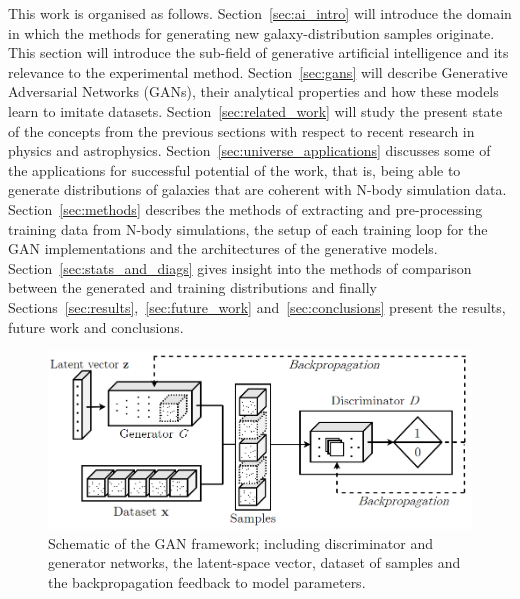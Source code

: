 \documentclass[twocolumn]{article}
\numberwithin{equation}{section}
\begin{document}
This work is organised as follows. Section~\ref{sec:ai_intro} will introduce the domain in which the methods for 
generating new galaxy-distribution samples originate. This section will introduce the sub-field of generative artificial 
intelligence and its relevance to the experimental method. Section~\ref{sec:gans} will describe Generative Adversarial 
Networks (GANs), their analytical properties and how these models learn to imitate datasets. Section~\ref{sec:related_work} 
will study the present state of the concepts from the previous sections with respect to recent research in physics and 
astrophysics. Section~\ref{sec:universe_applications} discusses some of the applications for successful potential of the 
work, that is, being able to generate distributions of galaxies that are coherent with N-body simulation data. 
Section~\ref{sec:methods} describes the methods of extracting and pre-processing training data from N-body simulations, 
the setup of each training loop for the GAN implementations and the architectures of the generative models. 
Section~\ref{sec:stats_and_diags} gives insight into the methods of comparison between the generated and training 
distributions and finally Sections~\ref{sec:results},~\ref{sec:future_work} and~\ref{sec:conclusions} present the results, 
future work and conclusions.


\begin{figure}
\includegraphics[width=\columnwidth]{figures/diagrams/GAN_diagram1.png}
\centering
\caption{Schematic of the GAN framework; including discriminator and generator networks, the latent-space vector, dataset 
of samples and the backpropagation feedback to model parameters.}
\label{fig:GAN_diagram}
\end{figure}
\end{document}
